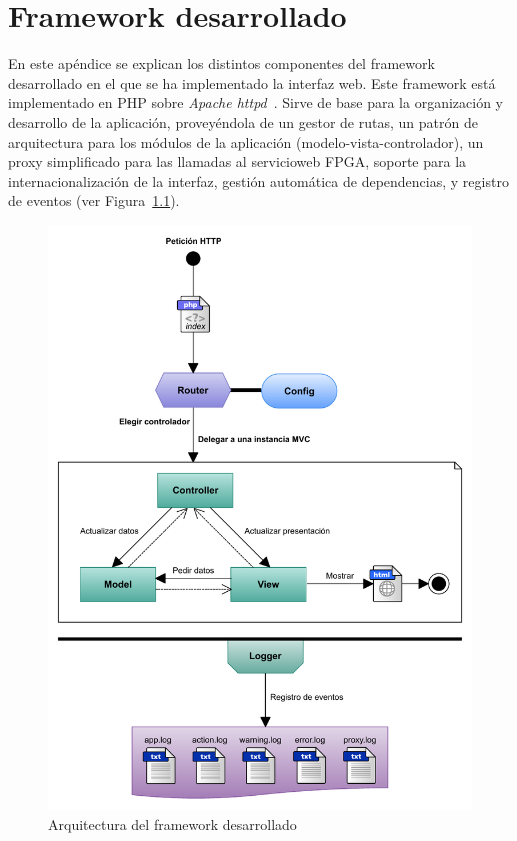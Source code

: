 \chapter{Framework desarrollado\label{extra:frameworkDesarrollado}}

En este apéndice se explican los distintos componentes del \gls{framework} desarrollado en el que se ha implementado la interfaz web.
Este \gls{framework} está implementado en \gls{PHP} sobre \textit{Apache httpd}~\cite{httpd}.
Sirve de base para la organización y desarrollo de la aplicación, proveyéndola de un gestor de rutas, un patrón de arquitectura para los módulos de la aplicación (modelo-vista-controlador), un \gls{proxy} simplificado para las llamadas al \gls{servicioweb} \gls{FPGA}, soporte para la internacionalización de la interfaz, gestión automática de dependencias, y registro de eventos (ver Figura~\ref{fig:framework}).

\begin{figure}[!htp]
  \centering
  \includegraphics[width=\textwidth,clip=true]{graphics/framework}
  \caption{Arquitectura del \gls{framework} desarrollado}
  \label{fig:framework}
\end{figure}


